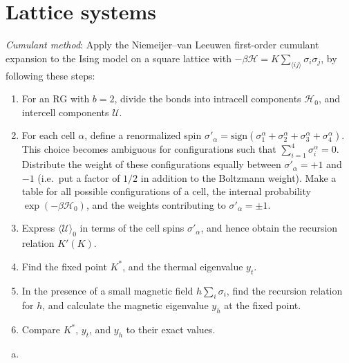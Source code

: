 \chapter{Lattice systems}

\begin{problem}
    \textit{Cumulant method}: Apply the Niemeijer--van Leeuwen first-order cumulant expansion to the Ising model on a square lattice with $-\beta\mathcal{H} = K\sum_{\langle ij\rangle}\sigma_i\sigma_j$, by following these steps:

    \begin{enumerate}
        \item[(a)] For an RG with $b = 2$, divide the bonds into intracell components $\mathcal{H}_0$, and intercell components $\mathcal{U}$.

        \item[(b)] For each cell $\alpha$, define a renormalized spin $\sigma'_\alpha = \text{sign}(\sigma_1^\alpha + \sigma_2^\alpha + \sigma_3^\alpha + \sigma_4^\alpha)$. This choice becomes ambiguous for configurations such that $\sum_{i=1}^4\sigma_i^\alpha = 0$. Distribute the weight of these configurations equally between $\sigma'_\alpha = +1$ and $-1$ (i.e.\ put a factor of $1/2$ in addition to the Boltzmann weight). Make a table for all possible configurations of a cell, the internal probability $\exp(-\beta\mathcal{H}_0)$, and the weights contributing to $\sigma'_\alpha = \pm 1$.

        \item[(c)] Express $\langle\mathcal{U}\rangle_0$ in terms of the cell spins $\sigma'_\alpha$, and hence obtain the recursion relation $K'(K)$.

        \item[(d)] Find the fixed point $K^*$, and the thermal eigenvalue $y_t$.

        \item[(e)] In the presence of a small magnetic field $h\sum_i\sigma_i$, find the recursion relation for $h$, and calculate the magnetic eigenvalue $y_h$ at the fixed point.

        \item[(f)] Compare $K^*$, $y_t$, and $y_h$ to their exact values.
    \end{enumerate}
\end{problem}

\begin{solution}
    \begin{enumerate}[(a)]
        \item
    \end{enumerate}
\end{solution}

